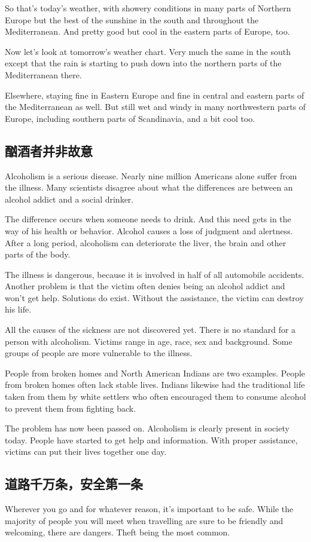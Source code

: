 So that's today's weather, with showery conditions in many
parts of Northern Europe but the best of the sunshine in the
south and throughout the Mediterranean. And pretty
good but cool in the eastern parts of Europe, too.

Now let's look at tomorrow's weather chart. Very
much the same in the south except that the rain is starting
to push down into the northern parts of the Mediterranean
there.

Elsewhere, staying fine in Eastern Europe and fine in central
and eastern parts of the Mediterranean as well. But still
wet and windy in many northwestern parts of Europe, including
southern parts of Scandinavia, and a bit cool too.
\subsection{酗酒者并非故意}
Alcoholism is a serious disease. Nearly nine million Americans
alone suffer from the illness. Many scientists disagree
about what the differences are between an alcohol addict
and a social drinker.

The difference occurs when someone needs to drink. And
this need gets in the way of his health or behavior. Alcohol
causes a loss of judgment and alertness. After a long
period, alcoholism can deteriorate the liver, the brain and
other parts of the body.

The illness is dangerous, because it is involved in half of all
automobile accidents. Another problem is that the
victim often denies being an alcohol addict and won't get
help. Solutions do exist. Without the assistance, the victim
can destroy his life.

All the causes of the sickness are not discovered yet.
There is no standard for a person with alcoholism. Victims
range in age, race, sex and background. Some groups of
people are more vulnerable to the illness.

People from broken homes and North American Indians
are two examples. People from broken homes often lack
stable lives. Indians likewise had the traditional life
taken from them by white settlers who often encouraged
them to consume alcohol to prevent them from fighting
back.

The problem has now been passed on. Alcoholism is
clearly present in society today. People have started to
get help and information. With proper assistance, victims
can put their lives together one day.
\subsection{道路千万条，安全第一条}
Wherever you go and for whatever reason, it's important to
be safe. While the majority of people you will meet when
travelling are sure to be friendly and welcoming,
there are dangers. Theft being the most common.

